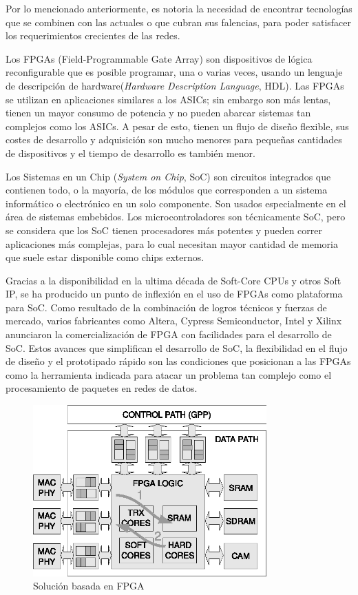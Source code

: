Por lo mencionado anteriormente, es notoria la necesidad de encontrar tecnologías que se combinen con las actuales o que cubran sus falencias, para poder satisfacer los requerimientos crecientes de las redes. 

Los FPGAs (Field-Programmable Gate Array) son dispositivos de lógica reconfigurable que es posible programar, una o varias veces, usando un lenguaje de descripción de hardware(\textit{Hardware Description Language}, HDL). Las FPGAs se utilizan en aplicaciones similares a los ASICs; sin embargo son más lentas, tienen un mayor consumo de potencia y no pueden abarcar sistemas tan complejos como los ASICs. A pesar de esto, tienen un flujo de diseño flexible, sus costes de desarrollo y adquisición son mucho menores para pequeñas cantidades de dispositivos y el tiempo de desarrollo es también menor.



Los Sistemas en un Chip (\textit{System on Chip}, SoC) son circuitos integrados que contienen todo, o la mayoría, de los módulos que corresponden a un sistema informático o electrónico en un solo componente. Son usados especialmente en el área de sistemas embebidos. Los microcontroladores son técnicamente SoC, pero se considera que los SoC tienen procesadores más potentes y pueden correr aplicaciones más complejas, para lo cual necesitan mayor cantidad de memoria que suele estar disponible como chips externos. 

Gracias a la disponibilidad en la ultima década de Soft-Core CPUs y otros Soft IP, se ha producido un punto de inflexión en el uso de FPGAs como plataforma para SoC. Como resultado de la combinación de logros técnicos y fuerzas de mercado, varios fabricantes como Altera, Cypress Semiconductor, Intel y Xilinx anunciaron la comercialización de FPGA con facilidades para el desarrollo de SoC.
Estos avances que simplifican el desarrollo de SoC, la flexibilidad en el flujo de diseño y el prototipado rápido son las condiciones que posicionan a las FPGAs como la herramienta indicada para atacar un problema tan complejo como el procesamiento de paquetes en redes de datos.

 \begin{figure}[h]
  \centering
	 \includegraphics[width=0.8\textwidth]{1-introduccion/graf/FPGA_based.eps}
  \caption{Solución basada en FPGA}
  \label{fig:diseno}
\end{figure}

